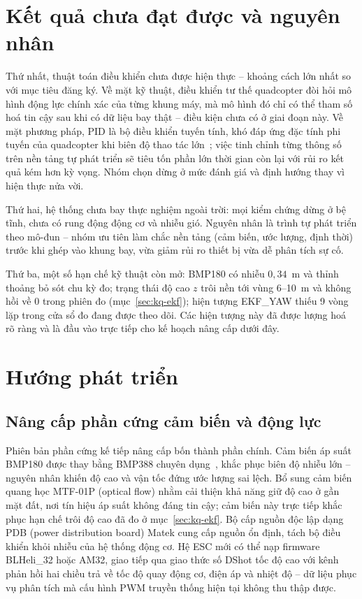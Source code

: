 \section{Kết quả chưa đạt được và nguyên nhân}\label{sec:kl-chuadat}

Thứ nhất, thuật toán điều khiển chưa được hiện thực -- khoảng cách lớn nhất so với mục tiêu đăng ký. Về mặt kỹ thuật, điều khiển tư thế quadcopter đòi hỏi mô hình động lực chính xác của từng khung máy, mà mô hình đó chỉ có thể tham số hoá tin cậy sau khi có dữ liệu bay thật -- điều kiện chưa có ở giai đoạn này. Về mặt phương pháp, PID là bộ điều khiển tuyến tính, khó đáp ứng đặc tính phi tuyến của quadcopter khi biên độ thao tác lớn~\cite{ogata}; việc tinh chỉnh từng thông số trên nền tảng tự phát triển sẽ tiêu tốn phần lớn thời gian còn lại với rủi ro kết quả kém hơn kỳ vọng. Nhóm chọn dừng ở mức đánh giá và định hướng thay vì hiện thực nửa vời.

Thứ hai, hệ thống chưa bay thực nghiệm ngoài trời: mọi kiểm chứng dừng ở bệ tĩnh, chưa có rung động động cơ và nhiễu gió. Nguyên nhân là trình tự phát triển theo mô-đun -- nhóm ưu tiên làm chắc nền tảng (cảm biến, ước lượng, định thời) trước khi ghép vào khung bay, vừa giảm rủi ro thiết bị vừa dễ phân tích sự cố.

Thứ ba, một số hạn chế kỹ thuật còn mở: BMP180 có nhiễu $0{,}34$~m và thỉnh thoảng bỏ sót chu kỳ đo; trạng thái độ cao $z$ trôi nền tới vùng 6--10~m và không hồi về 0 trong phiên đo (mục~\ref{sec:kq-ekf}); hiện tượng EKF\_YAW thiếu 9 vòng lặp trong cửa sổ đo đang được theo dõi. Các hiện tượng này đã được lượng hoá rõ ràng và là đầu vào trực tiếp cho kế hoạch nâng cấp dưới đây.

\section{Hướng phát triển}\label{sec:kl-huong}

\subsection*{Nâng cấp phần cứng cảm biến và động lực}

Phiên bản phần cứng kế tiếp nâng cấp bốn thành phần chính. Cảm biến áp suất BMP180 được thay bằng BMP388 chuyên dụng~\cite{bmp388}, khắc phục biên độ nhiễu lớn -- nguyên nhân khiến độ cao và vận tốc đứng ước lượng sai lệch. Bổ sung cảm biến quang học MTF-01P (optical flow) nhằm cải thiện khả năng giữ độ cao ở gần mặt đất, nơi tín hiệu áp suất không đáng tin cậy; cảm biến này trực tiếp khắc phục hạn chế trôi độ cao đã đo ở mục~\ref{sec:kq-ekf}. Bộ cấp nguồn độc lập dạng PDB (power distribution board) Matek cung cấp nguồn ổn định, tách bộ điều khiển khỏi nhiễu của hệ thống động cơ. Hệ ESC mới có thể nạp firmware BLHeli\_32 hoặc AM32, giao tiếp qua giao thức số DShot tốc độ cao với kênh phản hồi hai chiều trả về tốc độ quay động cơ, điện áp và nhiệt độ -- dữ liệu phục vụ phân tích mà cấu hình PWM truyền thống hiện tại không thu thập được.

